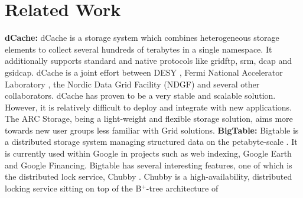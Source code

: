 \documentclass[final]{ieee}
\begin{document}
\section{Related Work}
\label{Related Work}
\textbf{dCache:} dCache is a storage system which combines heterogeneous storage
elements to collect several hundreds of terabytes in a single
namespace. It additionally supports standard and native
protocols like gridftp, srm, dcap and gsidcap. dCache is
a joint effort between DESY \cite{dCachesite}, Fermi National Accelerator Laboratory \cite{FermiLab}, the  Nordic Data
Grid Facility (NDGF) \cite{NDGF}  and several other collaborators. %
dCache has proven to be a very stable and scalable solution. However,
it is relatively difficult to deploy and integrate with new applications. 
The ARC Storage, being a light-weight and flexible
storage solution, aims more towards new user groups less familiar with
Grid solutions. 
\newline
\textbf{BigTable:} Bigtable is a distributed storage system managing structured data on
the petabyte-scale \cite{Bigtable}. It is currently used within
Google in projects such as web indexing, Google Earth and Google
Financing. %
Bigtable has several interesting features, one of which is the
distributed lock service, Chubby \cite{Chubby}. Chubby is a high-availability, distributed
locking service sitting on top of the B$^+$-tree architecture of
\end{document}
